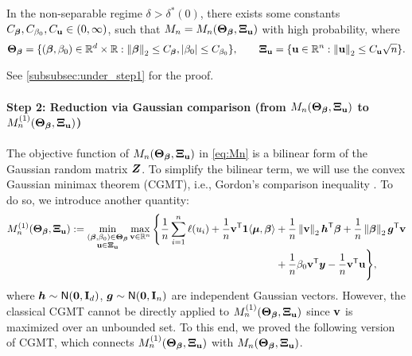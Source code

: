 \begin{lem} \label{lem:ERM_bound_beta}
    In the non-separable regime $\delta > \delta^*(0)$, there exists some constants $C_{\bbeta}, C_{\beta_0}, C_{\bu} \in (0, \infty)$, such that $M_n = M_n(\bTheta_{\vbeta}, \bXi_{\bu})$ with high probability, where
    \begin{equation*}
    \bTheta_{\vbeta} = \{ (\vbeta, \beta_0) \in \R^d \times \R:  \norm{\vbeta}_2 \le C_{\vbeta},  \abs{\beta_0} \le C_{\beta_0}  \},
    \qquad
    \bXi_{\bu} = \{ \bu \in \R^n : \norm{\bu}_2 \le C_{\bu} \sqrt{n} \}.
    \end{equation*}
\end{lem}
\noindent
See \cref{subsubsec:under_step1} for the proof.

\paragraph{Step 2: Reduction via Gaussian comparison (from $M_n(\bTheta_{\vbeta}, \bXi_{\bu})$ to $M_n^{(1)}(\bTheta_{\vbeta}, \bXi_{\bu})$)}
The objective function of $M_n(\bTheta_{\vbeta}, \bXi_{\bu})$ in \cref{eq:Mn} is a bilinear form of the Gaussian random matrix $\ZZ$. To simplify the bilinear term, we will use the convex Gaussian minimax theorem (CGMT), i.e., Gordon's comparison inequality \cite{gordon1985some, thrampoulidis2015regularized}. To do so, we introduce another quantity:
\begin{equation*}
    \begin{aligned}
        M_n^{(1)}(\bTheta_{\vbeta}, \bXi_{\bu})
        : = \smash {\min_{ \substack{ (\bbeta , \beta_0) \in \bTheta_{\vbeta} \\  \bu \in \bXi_{\bu} } } }
        \max_{ \bv \in \R^n }
        \, \Biggl\{
        \frac1n \sum_{i=1}^n \ell( u_i )
         + \frac1n \bv^\top \bone \< \bmu, \vbeta \>
         & + \frac1n \norm{\bv}_2 \hh^\top \vbeta + \frac1n \norm{\vbeta}_2 \vg^\top \bv 
         \\
         & + \frac1n \beta_0 \bv^\top \yy - \frac1n \bv^\top \bu
         \Biggr\},
    \end{aligned}
\end{equation*}
where $\hh \sim \normal(\bzero, \bI_{d})$, $\vg \sim \normal(\bzero, \bI_{n})$ are independent Gaussian vectors. However, the classical CGMT cannot be directly applied to $M_n^{(1)}(\bTheta_{\vbeta}, \bXi_{\bu})$ since $\bv$ is maximized over an unbounded set. To this end, we proved the following version of CGMT, which connects $M_n^{(1)}(\bTheta_{\vbeta}, \bXi_{\bu})$ with $M_n(\bTheta_{\vbeta}, \bXi_{\bu})$.

